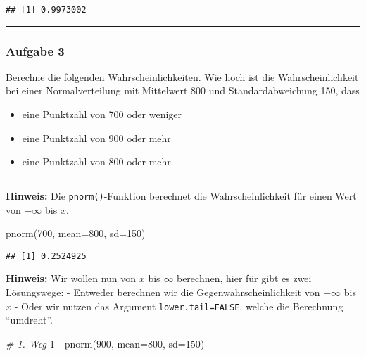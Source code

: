 \documentclass[
]{article}
\newenvironment{Shaded}{\begin{snugshade}}{\end{snugshade}}
\newcommand{\AttributeTok}[1]{\textcolor[rgb]{0.77,0.63,0.00}{#1}}
\newcommand{\CommentTok}[1]{\textcolor[rgb]{0.56,0.35,0.01}{\textit{#1}}}
\newcommand{\DecValTok}[1]{\textcolor[rgb]{0.00,0.00,0.81}{#1}}
\newcommand{\FunctionTok}[1]{\textcolor[rgb]{0.00,0.00,0.00}{#1}}
\newcommand{\NormalTok}[1]{#1}
\newcommand{\SpecialCharTok}[1]{\textcolor[rgb]{0.00,0.00,0.00}{#1}}
\providecommand{\tightlist}{%
  \setlength{\itemsep}{0pt}\setlength{\parskip}{0pt}}
\begin{document}
\begin{verbatim}
## [1] 0.9973002
\end{verbatim}

\begin{center}\rule{0.5\linewidth}{0.5pt}\end{center}

\hypertarget{aufgabe-3}{%
\subsubsection{Aufgabe 3}\label{aufgabe-3}}

Berechne die folgenden Wahrscheinlichkeiten. Wie hoch ist die
Wahrscheinlichkeit bei einer Normalverteilung mit Mittelwert 800 und
Standardabweichung 150, dass

\begin{itemize}
\tightlist
\item
  eine Punktzahl von 700 oder weniger
\item
  eine Punktzahl von 900 oder mehr
\item
  eine Punktzahl von 800 oder mehr
\end{itemize}

\begin{center}\rule{0.5\linewidth}{0.5pt}\end{center}

\textbf{Hinweis:} Die \texttt{pnorm()}-Funktion berechnet die
Wahrscheinlichkeit für einen Wert von \(-\infty\) bis \(x\).

\begin{Shaded}
\begin{Highlighting}[]
\FunctionTok{pnorm}\NormalTok{(}\DecValTok{700}\NormalTok{, }\AttributeTok{mean=}\DecValTok{800}\NormalTok{, }\AttributeTok{sd=}\DecValTok{150}\NormalTok{)}
\end{Highlighting}
\end{Shaded}

\begin{verbatim}
## [1] 0.2524925
\end{verbatim}

\textbf{Hinweis:} Wir wollen nun von \(x\) bis \(\infty\) berechnen,
hier für gibt es zwei Lösungswege: - Entweder berechnen wir die
Gegenwahrscheinlichkeit von \(-\infty\) bis \(x\) - Oder wir nutzen das
Argument \texttt{lower.tail=FALSE}, welche die Berechnung ``umdreht''.

\begin{Shaded}
\begin{Highlighting}[]
\CommentTok{\# 1. Weg}
\DecValTok{1} \SpecialCharTok{{-}} \FunctionTok{pnorm}\NormalTok{(}\DecValTok{900}\NormalTok{, }\AttributeTok{mean=}\DecValTok{800}\NormalTok{, }\AttributeTok{sd=}\DecValTok{150}\NormalTok{)}
\end{Highlighting}
\end{Shaded}
\end{document}
